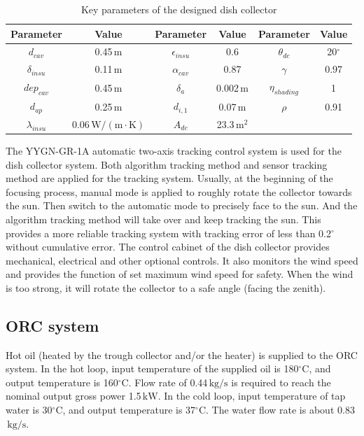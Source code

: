 \begin{table}[htbp]
	\caption{Key parameters of the designed dish collector}
	\begin{center}
	\begin{tabular}{cccccc}
		\toprule
		Parameter		&	Value	&	Parameter		&	Value	&	Parameter		&	Value\\
		\midrule
		$d_{cav}$	&	0.45$\,\mathrm{m}$	&	$\epsilon_{insu}$	&	0.6	&	$\theta_{dc}$	&	20$^\circ$\\
		$\delta_{insu}$	&	0.11$\,\mathrm{m}$	&	$\alpha_{cav}$	&	0.87	&	$\gamma$	&	0.97\\
		$dep_{cav}$	&	0.45$\,\mathrm{m}$	&	$\delta_a$		&	0.002$\,\mathrm{m}$	&	$\eta_{shading}$	&	1\\
		$d_{ap}$	&	0.25$\,\mathrm{m}$	&	$d_{i,1}$	&	0.07$\,\mathrm{m}$	&	$\rho$	&	0.91\\
		$\lambda_{insu}$	&	0.06$\,\mathrm{W/(m\cdot K)}$	&	$A_{dc}$	&	23.3$\,\mathrm{m^2}$	&	\\		
		\bottomrule
	\end{tabular}
	\end{center}
	\label{tab:ddc}
\end{table}

The YYGN-GR-1A automatic two-axis tracking control system is used for the dish collector system. Both algorithm tracking method and sensor tracking method are applied for the tracking system. Usually, at the beginning of the focusing process, manual mode is applied to roughly rotate the collector towards the sun. Then switch to the automatic mode to precisely face to the sun. And the algorithm tracking method will take over and keep tracking the sun. This provides a more reliable tracking system with tracking error of less than 0.2$^\circ$ without cumulative error.
The control cabinet of the dish collector provides mechanical, electrical and other optional controls. It also monitors the wind speed and provides the function of set maximum wind speed for safety. When the wind is too strong, it will rotate the collector to a safe angle (facing the zenith).

\subsection{ORC system}
Hot oil (heated by the trough collector and/or the heater) is supplied to the ORC system. 
In the hot loop, input temperature of the supplied oil is 180$\mathrm{^\circ C}$, and output temperature is 160$\mathrm{^\circ C}$. Flow rate of 0.44$\,\mathrm{kg/s}$ is required to reach the nominal output gross power 1.5$\,\mathrm{kW}$. In the cold loop, input temperature of tap water is 30$\mathrm{^\circ C}$, and output temperature is 37$\mathrm{^\circ C}$. The water flow rate is about 0.83$\,\mathrm{kg/s}$.

